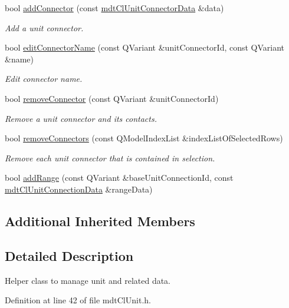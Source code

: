 \begin{DoxyCompactItemize}
bool \hyperlink{classmdt_cl_unit_acafdba8ebc2f5044b096282ecc41da41}{add\-Connector} (const \hyperlink{classmdt_cl_unit_connector_data}{mdt\-Cl\-Unit\-Connector\-Data} \&data)
\begin{DoxyCompactList}\small\item\em Add a unit connector. \end{DoxyCompactList}\item 
bool \hyperlink{classmdt_cl_unit_a7bb1ff9cc5469f45dbf244fd26d60329}{edit\-Connector\-Name} (const Q\-Variant \&unit\-Connector\-Id, const Q\-Variant \&name)
\begin{DoxyCompactList}\small\item\em Edit connector name. \end{DoxyCompactList}\item 
bool \hyperlink{classmdt_cl_unit_a86244b8f9b2ff41c05b32749c038813d}{remove\-Connector} (const Q\-Variant \&unit\-Connector\-Id)
\begin{DoxyCompactList}\small\item\em Remove a unit connector and its contacts. \end{DoxyCompactList}\item 
bool \hyperlink{classmdt_cl_unit_a5865c061516caf7d04b7569eba47c3af}{remove\-Connectors} (const Q\-Model\-Index\-List \&index\-List\-Of\-Selected\-Rows)
\begin{DoxyCompactList}\small\item\em Remove each unit connector that is contained in selection. \end{DoxyCompactList}\item 
bool \hyperlink{classmdt_cl_unit_a35a35f22daf4a408f5400031c12ce3cf}{add\-Range} (const Q\-Variant \&base\-Unit\-Connection\-Id, const \hyperlink{classmdt_cl_unit_connection_data}{mdt\-Cl\-Unit\-Connection\-Data} \&range\-Data)
\end{DoxyCompactItemize}
\subsection*{Additional Inherited Members}


\subsection{Detailed Description}
Helper class to manage unit and related data. 

Definition at line 42 of file mdt\-Cl\-Unit.\-h.



